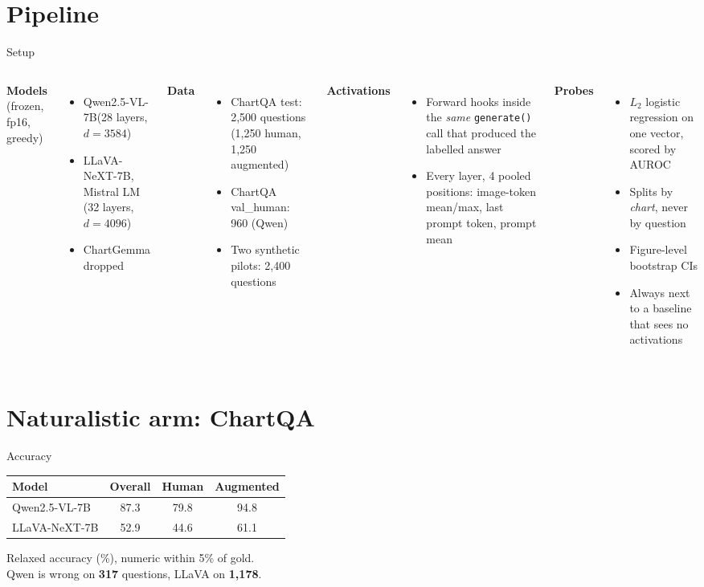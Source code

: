 \documentclass[10pt,aspectratio=169]{beamer}
\newcommand{\qwen}{Qwen2.5-VL-7B\xspace}
\newcommand{\llava}{LLaVA-NeXT-7B\xspace}
\begin{document}
\section{Pipeline}

\begin{frame}{Setup}
\small
\begin{columns}[T]
\textbf{Models} (frozen, fp16, greedy)
\begin{itemize}
\item \qwen (28 layers, $d=3584$)
\item \llava, Mistral LM (32 layers, $d=4096$)
\item ChartGemma dropped
\end{itemize}
\textbf{Data}
\begin{itemize}
\item ChartQA test: 2,500 questions (1,250 human, 1,250 augmented)
\item ChartQA val\_human: 960 (Qwen)
\item Two synthetic pilots: 2,400 questions
\end{itemize}
\textbf{Activations}
\begin{itemize}
\item Forward hooks inside the \emph{same} \texttt{generate()} call that produced
the labelled answer
\item Every layer, 4 pooled positions: image-token mean/max, last prompt token,
prompt mean
\end{itemize}
\textbf{Probes}
\begin{itemize}
\item $L_2$ logistic regression on one vector, scored by AUROC
\item Splits by \emph{chart}, never by question
\item Figure-level bootstrap CIs
\item Always next to a baseline that sees no activations
\end{itemize}
\end{columns}
\end{frame}

\section{Naturalistic arm: ChartQA}

\begin{frame}{Accuracy}
\centering
\begin{tabular}{lccc}
\toprule
Model & Overall & Human & Augmented \\
\midrule
\qwen & 87.3 & 79.8 & 94.8 \\
\llava & 52.9 & 44.6 & 61.1 \\
\bottomrule
\end{tabular}
\vspace{1em}

Relaxed accuracy (\%), numeric within 5\% of gold.\\
Qwen is wrong on \textbf{317} questions, LLaVA on \textbf{1,178}.
\end{frame}
\end{document}
